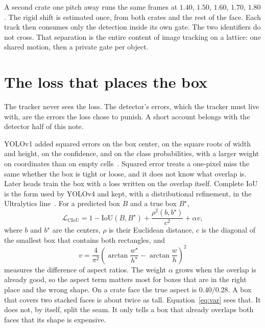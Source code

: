 \documentclass[11pt,a4paper]{article}
\begin{document}
A second crate one pitch away runs the same frames at $1.40$, $1.50$, $1.60$, $1.70$, $1.80$. The rigid shift is estimated once, from both crates and the rest of the face. Each track then consumes only the detection inside its own gate. The two identifiers do not cross. That separation is the entire content of image tracking on a lattice: one shared motion, then a private gate per object.

\section{The loss that places the box}

The tracker never sees the loss. The detector's errors, which the tracker must live with, are the errors the loss chose to punish. A short account belongs with the detector half of this note.

YOLOv1 added squared errors on the box center, on the square roots of width and height, on the confidence, and on the class probabilities, with a larger weight on coordinates than on empty cells~\cite{redmon2016yolo}. Squared error treats a one-pixel miss the same whether the box is tight or loose, and it does not know what overlap is. Later heads train the box with a loss written on the overlap itself. Complete IoU is the form used by YOLOv4 and kept, with a distributional refinement, in the Ultralytics line~\cite{zheng2020diou,bochkovskiy2020yolov4}. For a predicted box $B$ and a true box $B^{\star}$,
\begin{equation}
\mathcal{L}_{\mathrm{CIoU}} = 1 - \mathrm{IoU}(B,B^{\star}) + \frac{\rho^{2}(b,b^{\star})}{c^{2}} + \alpha v,
\label{eq:ciou}
\end{equation}
where $b$ and $b^{\star}$ are the centers, $\rho$ is their Euclidean distance, $c$ is the diagonal of the smallest box that contains both rectangles, and
\begin{equation}
v = \frac{4}{\pi^{2}}\left(\arctan\frac{w^{\star}}{h^{\star}} - \arctan\frac{w}{h}\right)^{2}
\label{eq:var}
\end{equation}
measures the difference of aspect ratios. The weight $\alpha$ grows when the overlap is already good, so the aspect term matters most for boxes that are in the right place and the wrong shape. On a crate face the true aspect is $0.40/0.28$. A box that covers two stacked faces is about twice as tall. Equation~\eqref{eq:var} sees that. It does not, by itself, split the seam. It only tells a box that already overlaps both faces that its shape is expensive.
\end{document}
